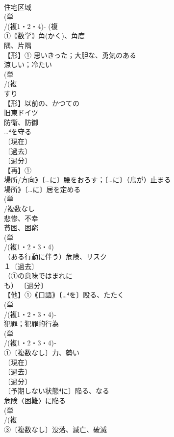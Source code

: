 \documentclass[8pt]{extreport}
\begin{document}
\begin{CJK}{UTF8}{min}
\\	住宅区域 
\\	(単
\\	/(複1・2・4)- (複
\\	①｟数学｠角(かく)、角度 
\\	隅、片隅 
\\	【形】① 思いきった；大胆な、勇気のある 
\\	涼しい；冷たい
\\	(単
\\	/(複
\\	すり 
\\	【形】以前の、かつての 
\\	旧東ドイツ
\\	防衛、防御 
\\	…⁴を守る
\\	〔現在〕
\\	〔過去〕
\\	〔過分〕
\\	【再】①
\\	場所/方向》〔…に〕腰をおろす；〔…に〕（鳥が）止まる　
\\	場所》〔…に〕居を定める
\\	(単
\\	/複数なし 
\\	悲惨、不幸 
\\	貧困、困窮
\\	(単
\\	/(複1・2・3・4)
\\	（ある行動に伴う）危険、リスク 
\\	１〔過去〕
\\	（①の意味ではまれに
\\	も） 〔過分〕
\\	【他】①｟口語｠〔…⁴を〕殴る、たたく 
\\	(単
\\	/(複1・2・3・4)‐ 
\\	犯罪；犯罪的行為 
\\	(単
\\	/(複1・2・3・4)‐
\\	①〔複数なし〕力、勢い 
\\	〔現在〕
\\	〔過去〕
\\	〔過分〕
\\	〔予期しない状態⁴に〕陥る、なる 
\\	危険〈困難〉に陥る
\\	(単
\\	/(複
\\	③〔複数なし〕没落、滅亡、破滅

\end{CJK}
\end{document}
